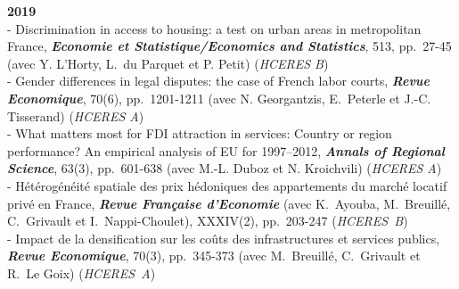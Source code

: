 \documentclass[a4paper,12pt]{article}
\begin{document}
\noindent \textbf{2019}  \smallskip \\ 
- Discrimination in access to housing: a test on urban areas in metropolitan France, \textit{\textbf{Economie et Statistique/Economics and Statistics}}, 513, pp.~27-45 (avec Y. L'Horty, L.~du Parquet et P. Petit) (\textit{HCERES B})\\
- Gender differences in legal disputes: the case of French labor courts, \textit{\textbf{Revue Economique}}, 70(6), pp.~1201-1211 (avec N. Georgantzis, E.~Peterle et J.-C. Tisserand) (\textit{HCERES A})\\	
- What matters most for FDI attraction in services: Country or region performance? An empirical analysis of EU for 1997–2012, \textit{\textbf{Annals of Regional Science}}, 63(3), pp.~601-638 (avec M.-L. Duboz et N. Kroichvili) (\textit{HCERES A})\\ 
- Hétérogénéité spatiale des prix hédoniques des appartements du marché locatif privé en France, \textit{\textbf{Revue Française d'Economie}} (avec K.~Ayouba, M.~Breuillé, C.~Grivault et I.~Nappi-Choulet), XXXIV(2), pp.~203-247 (\textit{HCERES~B}) \\
- Impact de la densification sur les coûts des infrastructures et services publics, \textit{\textbf{Revue Economique}}, 70(3), pp.~345-373 (avec M.~Breuillé, C.~Grivault et R.~Le Goix) (\textit{HCERES~A}) \\
		
\end{document}
